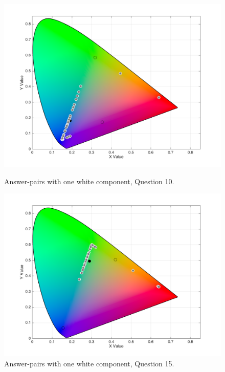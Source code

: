 \begin{figure}[!htbp]
  \centering
  \vspace{-10pt}
  \begin{minipage}{0.4\textwidth}
    \centering
    \includegraphics[width=\textwidth]{images/results/10_white_answers.png}
    \caption[Answer-pairs with one white component, from Question 10.]{Answer-pairs with one white component, Question 10.}
    \label{fig:white_2}
  \end{minipage}
  \begin{minipage}{0.4\textwidth}
    \centering
    \includegraphics[width=\textwidth]{images/results/15_white_answers.png}
    \caption[Answer-pairs with one white component, from Question 15.]{Answer-pairs with one white component, Question 15.}
    \label{fig:white_3}
  \end{minipage}
  \vspace{-10pt}
\end{figure}
%
